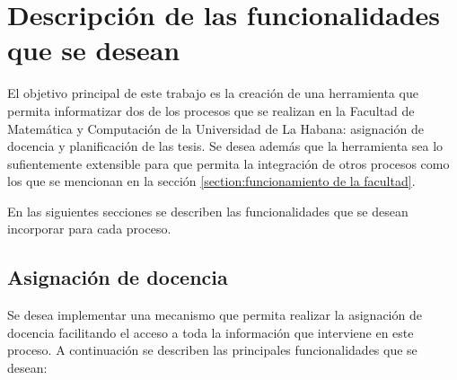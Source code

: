 \chapter{Descripción de las funcionalidades que se desean}\label{chapter:features}
El objetivo principal de este trabajo es la creación de una herramienta
que permita informatizar dos de los procesos que se realizan en la Facultad de Matemática y
Computación de la Universidad de La Habana: asignación de docencia y planificación de las tesis. Se desea además que la herramienta sea lo sufientemente 
extensible para que permita la integración de otros procesos como los que se mencionan en la 
sección \ref{section:funcionamiento de la facultad}.



En las siguientes secciones se describen las funcionalidades
que se desean incorporar para cada proceso.















\section{Asignación de docencia}
Se desea implementar una mecanismo que permita realizar la asignación de docencia 
facilitando el acceso a toda la información que interviene en este proceso. A continuación 
se describen las principales funcionalidades que se desean:



